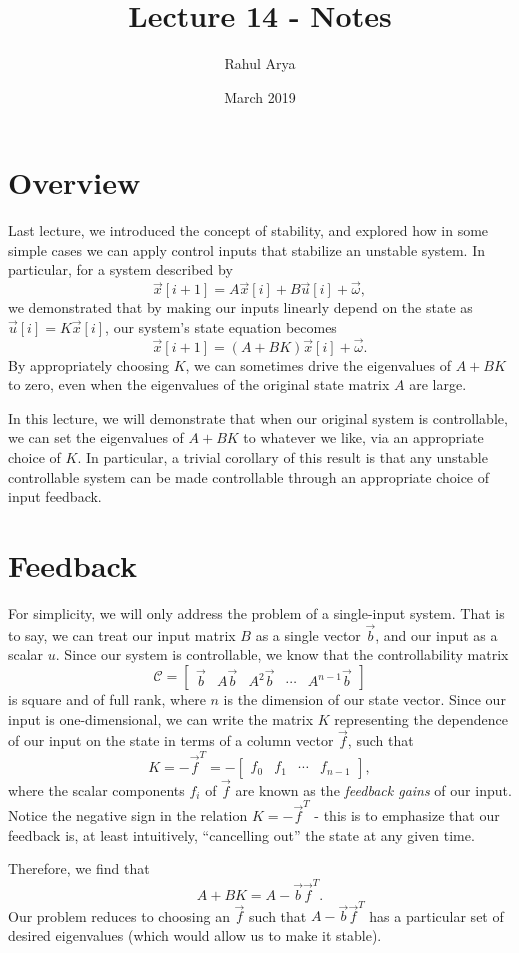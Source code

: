 \documentclass[letterpaper]{article}
\title{Lecture 14 - Notes}
\author{Rahul Arya}
\date{March 2019}
\theoremstyle{remark}
\newcommand{\mat}[1]{\ensuremath{\begin{bmatrix}#1\end{bmatrix}}}
\begin{document}
\maketitle

\section{Overview}
Last lecture, we introduced the concept of stability, and explored how in some simple cases we can apply control inputs that stabilize an unstable system. In particular, for a system described by
\[
    \vec{x}[i + 1] = A\vec{x}[i] + B\vec{u}[i] + \vec{\omega},
\]
we demonstrated that by making our inputs linearly depend on the state as $\vec{u}[i] = K\vec{x}[i]$, our system's state equation becomes
\[
    \vec{x}[i + 1] = (A + BK)\vec{x}[i] + \vec{\omega}.
\]
By appropriately choosing $K$, we can sometimes drive the eigenvalues of $A + BK$ to zero, even when the eigenvalues of the original state matrix $A$ are large.

In this lecture, we will demonstrate that when our original system is controllable, we can set the eigenvalues of $A + BK$ to whatever we like, via an appropriate choice of $K$. In particular, a trivial corollary of this result is that any unstable controllable system can be made controllable through an appropriate choice of input feedback.

\section{Feedback}
For simplicity, we will only address the problem of a single-input system. That is to say, we can treat our input matrix $B$ as a single vector $\vec{b}$, and our input as a scalar $u$. Since our system is controllable, we know that the controllability matrix
\[
    \mathscr{C} = \mat{\vec{b} & A\vec{b} & A^2\vec{b} & \cdots & A^{n - 1}\vec{b}}
\]
is square and of full rank, where $n$ is the dimension of our state vector. Since our input is one-dimensional, we can write the matrix $K$ representing the dependence of our input on the state in terms of a column vector $\vec{f}$, such that
\[
    K = -\vec{f}^T = -\mat{f_0 & f_1 & \cdots & f_{n - 1}},
\]
where the scalar components $f_i$ of $\vec{f}$ are known as the \emph{feedback gains} of our input. Notice the negative sign in the relation $K = -\vec{f}^T$ - this is to emphasize that our feedback is, at least intuitively, ``cancelling out'' the state at any given time.

Therefore, we find that
\[
    A + BK = A - \vec{b} \vec{f}^T.
\]
Our problem reduces to choosing an $\vec{f}$ such that $A - \vec{b}\vec{f}^T$ has a particular set of desired eigenvalues (which would allow us to make it stable).
\end{document}
